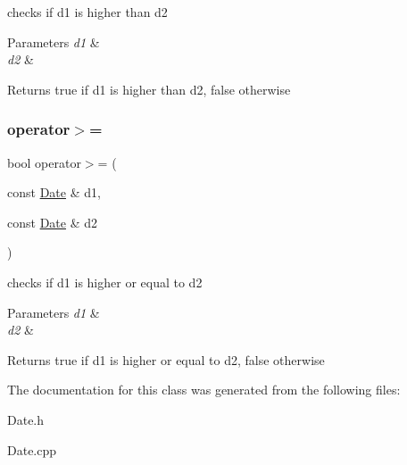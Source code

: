 checks if d1 is higher than d2 


\begin{DoxyParams}{Parameters}
{\em d1} & \\
\hline
{\em d2} & \\
\hline
\end{DoxyParams}
\begin{DoxyReturn}{Returns}
true if d1 is higher than d2, false otherwise 
\end{DoxyReturn}
\hypertarget{class_date_a9aae61020a07731a50cc80927fd8d346}{}\label{class_date_a9aae61020a07731a50cc80927fd8d346} 
\subsubsection{\texorpdfstring{operator$>$=}{operator>=}}
{\footnotesize\ttfamily bool operator$>$= (\begin{DoxyParamCaption}\item[{const \hyperlink{class_date}{Date} \&}]{d1,  }\item[{const \hyperlink{class_date}{Date} \&}]{d2 }\end{DoxyParamCaption})\hspace{0.3cm}{\ttfamily [friend]}}



checks if d1 is higher or equal to d2 


\begin{DoxyParams}{Parameters}
{\em d1} & \\
\hline
{\em d2} & \\
\hline
\end{DoxyParams}
\begin{DoxyReturn}{Returns}
true if d1 is higher or equal to d2, false otherwise 
\end{DoxyReturn}


The documentation for this class was generated from the following files\+:\begin{DoxyCompactItemize}
\item 
Date.\+h\item 
Date.\+cpp\end{DoxyCompactItemize}
